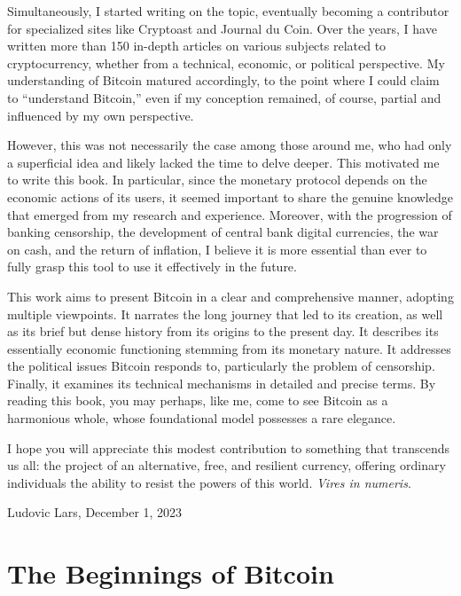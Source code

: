 \documentclass[
  a5paper,
  smalldemyvopaper,10pt,twoside,onecolumn,openright,extrafontsizes,hidelinks]{memoir}
\begin{document}
Simultaneously, I started writing on the topic, eventually becoming a
contributor for specialized sites like Cryptoast and Journal du Coin.
Over the years, I have written more than 150 in-depth articles on
various subjects related to cryptocurrency, whether from a technical,
economic, or political perspective. My understanding of Bitcoin matured
accordingly, to the point where I could claim to ``understand Bitcoin,''
even if my conception remained, of course, partial and influenced by my
own perspective.

However, this was not necessarily the case among those around me, who
had only a superficial idea and likely lacked the time to delve deeper.
This motivated me to write this book. In particular, since the monetary
protocol depends on the economic actions of its users, it seemed
important to share the genuine knowledge that emerged from my research
and experience. Moreover, with the progression of banking censorship,
the development of central bank digital currencies, the war on cash, and
the return of inflation, I believe it is more essential than ever to
fully grasp this tool to use it effectively in the future.

This work aims to present Bitcoin in a clear and comprehensive manner,
adopting multiple viewpoints. It narrates the long journey that led to
its creation, as well as its brief but dense history from its origins to
the present day. It describes its essentially economic functioning
stemming from its monetary nature. It addresses the political issues
Bitcoin responds to, particularly the problem of censorship. Finally, it
examines its technical mechanisms in detailed and precise terms. By
reading this book, you may perhaps, like me, come to see Bitcoin as a
harmonious whole, whose foundational model possesses a rare elegance.

I hope you will appreciate this modest contribution to something that
transcends us all: the project of an alternative, free, and resilient
currency, offering ordinary individuals the ability to resist the powers
of this world. \emph{Vires in numeris}.

Ludovic Lars, December 1, 2023


\chapter{The Beginnings of Bitcoin}\label{ch:mythe}

\label{enotezch:1}{}
\end{document}
